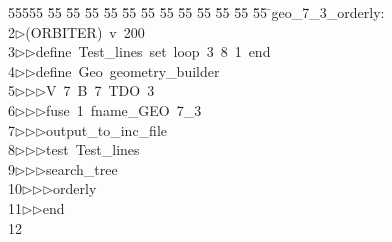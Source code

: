 %
%
\begin{tabbing}
55555 \= 55 \= 55 \= 55 \= 55 \= 55 \= 55 \= 55 \= 55 \= 55 \= 55 \= 55 \= 55 \= \>geo\_7\_3\_orderly:\\[0pt]
2\>$\triangleright$\>(ORBITER)\ v\ 200\ \\[0pt]
3\>$\triangleright$\>$\triangleright$\>define\ Test\_lines\ set\ loop\ 3\ 8\ 1\ end\ \\[0pt]
4\>$\triangleright$\>$\triangleright$\>define\ Geo\ geometry\_builder\ \\[0pt]
5\>$\triangleright$\>$\triangleright$\>$\triangleright$\>V\ 7\ B\ 7\ TDO\ 3\ \\[0pt]
6\>$\triangleright$\>$\triangleright$\>$\triangleright$\>fuse\ 1\ fname\_GEO\ 7\_3\ \\[0pt]
7\>$\triangleright$\>$\triangleright$\>$\triangleright$\>output\_to\_inc\_file\ \\[0pt]
8\>$\triangleright$\>$\triangleright$\>$\triangleright$\>test\ Test\_lines\ \\[0pt]
9\>$\triangleright$\>$\triangleright$\>$\triangleright$\>search\_tree\ \\[0pt]
10\>$\triangleright$\>$\triangleright$\>$\triangleright$\>orderly\ \\[0pt]
11\>$\triangleright$\>$\triangleright$\>end\\[0pt]
12\>\end{tabbing}
